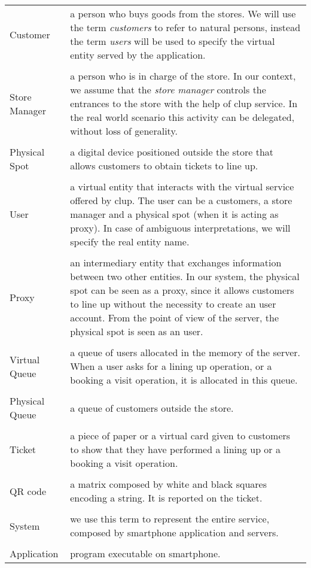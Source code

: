 \begin{tabularx}{\textwidth}{ >{\hsize=0.2\textwidth}X >{\hsize=0.8\textwidth}X}
  Customer & a person who buys goods from the stores. We will use the term \textit{customers} to refer to natural persons, instead the term \textit{users} will be used to specify the virtual entity served by the application.\\ \\
  Store Manager & a person who is in charge of the store. In our context, we assume that the \textit{store manager} controls the entrances to the store with the help of \gls{clup} service. In the real world scenario this activity can be delegated, without loss of generality.\\ \\
  Physical Spot & a digital device positioned outside the store that allows customers to obtain tickets to line up.\\ \\
  User & a virtual entity that interacts with the virtual service offered by \gls{clup}. The user can be a customers, a store manager and a physical spot (when it is acting as proxy). In case of ambiguous interpretations, we will specify the real entity name.\\ \\
  Proxy & an intermediary entity that exchanges information between two other entities. In our system, the physical spot can be seen as a proxy, since it allows customers to line up without the necessity to create an user account. From the point of view of the server, the physical spot is seen as an user.\\ \\
  Virtual Queue & a queue of users allocated in the memory of the server. When a user asks for a lining up operation, or a booking a visit operation, it is allocated in this queue.\\ \\
  Physical Queue & a queue of customers outside the store.\\ \\
  Ticket & a piece of paper or a virtual card given to customers to show that they have performed a lining up or a booking a visit operation.\\ \\
  QR code & a matrix composed by white and black squares encoding a string. It is reported on the ticket.\\ \\
  System & we use this term to represent the entire service, composed by smartphone application and servers.\\ \\
  Application & program executable on smartphone.
\end{tabularx}

